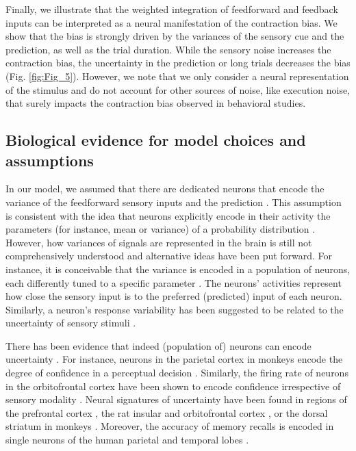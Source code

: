 \documentclass[10pt,a4paper]{article}
\begin{document}
Finally, we illustrate that the weighted integration of feedforward and feedback inputs can be interpreted as a neural manifestation of the contraction bias. We show that the bias is strongly driven by the variances of the sensory cue and the prediction, as well as the trial duration. While the sensory noise increases the contraction bias, the uncertainty in the prediction or long trials decreases the bias (Fig. \ref{fig:Fig_5}). However, we note that we only consider a neural representation of the stimulus and do not account for other sources of noise, like execution noise, that surely impacts the contraction bias observed in behavioral studies.
 
\subsection*{Biological evidence for model choices and assumptions}
%
In our model, we assumed that there are dedicated neurons that encode the variance of the feedforward sensory inputs and the prediction \citep[see also][]{wilmes2023uncertainty}. This assumption is consistent with the idea that neurons explicitly encode in their activity the parameters (for instance, mean or variance) of a probability distribution \citep{o2010coding, o2012can}. However, how variances of signals are represented in the brain is still not comprehensively understood and alternative ideas have been put forward. For instance, it is conceivable that the variance is encoded in a population of neurons, each differently tuned to a specific parameter \citep{knill2004bayesian}. The neurons' activities represent how close the sensory input is to the preferred (predicted) input of each neuron. Similarly, a neuron's response variability has been suggested to be related to the uncertainty of sensory stimuli \citep{hoyer2002interpreting, ma2006bayesian}.

There has been evidence that indeed (population of) neurons can encode uncertainty \citep{soltani2019adaptive}. For instance, neurons in the parietal cortex in monkeys encode the degree of confidence in a perceptual decision \citep{kiani2009representation}. Similarly, the firing rate of neurons in the orbitofrontal cortex have been shown to encode confidence irrespective of sensory modality \citep{masset2020behavior}. Neural signatures of uncertainty have been found in regions of the prefrontal cortex \citep{rushworth2008choice}, the rat insular and orbitofrontal cortex \citep{jo2016differential}, or the dorsal striatum in monkeys \citep{white2016neurons}. Moreover, the accuracy of memory recalls is encoded in single neurons of the human parietal and temporal lobes \cite{rutishauser2015representation, rutishauser2018single}.
\end{document}
